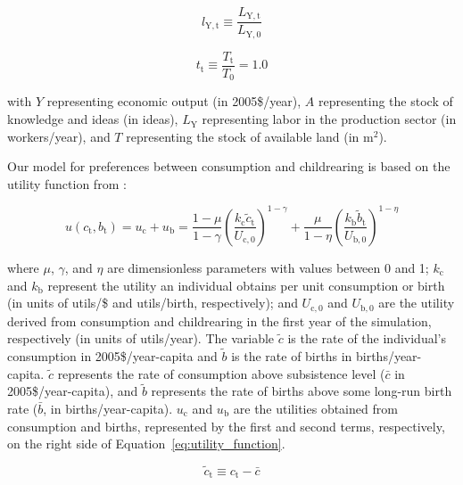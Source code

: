 \documentclass[letterpaper,12pt]{article}
\begin{document}
\begin{equation} \label{eq:index_l}
	l_\mathrm{Y,t} \equiv \frac{L_\mathrm{Y,t}}{L_\mathrm{Y,0}}
\end{equation}

\begin{equation} \label{eq:index_t}
	t_\mathrm{t} \equiv \frac{T_\mathrm{t}}{T_\mathrm{0}} = 1.0
\end{equation}

\noindent with $Y$ representing economic output (in 2005\$/year), $A$ representing the stock of knowledge and ideas (in ideas), $L_\mathrm{Y}$ representing labor in the production sector (in workers/year), and $T$ representing the stock of available land (in m$^2$).

Our model for preferences between consumption and childrearing is based on the utility function from \citet{Jones:2001wn}:

\begin{equation} \label{eq:utility_function}
	u(c_\mathrm{t}, b_\mathrm{t}) = u_\mathrm{c} + u_\mathrm{b} = \frac{1-\mu}{1-\gamma} \left(\frac{k_\mathrm{c} \tilde c_\mathrm{t}}{U_\mathrm{c,0}} \right)^{1-\gamma} + \frac{\mu}{1-\eta} \left(\frac{k_\mathrm{b} \tilde b_\mathrm{t}}{U_\mathrm{b,0}} \right)^{1-\eta}
\end{equation}

\noindent where $\mu$, $\gamma$, and $\eta$ are dimensionless parameters with values between 0 and 1; $k_\mathrm{c}$ and $k_\mathrm{b}$ represent the utility an individual obtains per unit consumption or birth (in units of utils/\$ and utils/birth, respectively); and $U_{\mathrm{c,0}}$ and $U_{\mathrm{b,0}}$ are the utility derived from consumption and childrearing in the first year of the simulation, respectively (in units of utils/year). The variable $\tilde c$ is the rate of the individual's consumption in 2005\$/year-capita and $\tilde b$ is the rate of births in births/year-capita. $\tilde c$ represents the rate of consumption above subsistence level ($\bar c$ in 2005\$/year-capita), and $\tilde b$ represents the rate of births above some long-run birth rate ($\bar b$, in births/year-capita). $u_\mathrm{c}$ and $u_\mathrm{b}$ are the utilities obtained from consumption and births, represented by the first and second terms, respectively, on the right side of Equation~\ref{eq:utility_function}.

\begin{equation} \label{eq:c_tilde}
	\tilde c_\mathrm{t} \equiv c_\mathrm{t} - \bar c
\end{equation}
\end{document}
